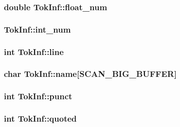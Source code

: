 \subsubsection[{\texorpdfstring{float\+\_\+num}{float_num}}]{\setlength{\rightskip}{0pt plus 5cm}double Tok\+Inf\+::float\+\_\+num}\hypertarget{structTokInf_afddf6ad76bb496c8ddd35a5b773f4360}{}\label{structTokInf_afddf6ad76bb496c8ddd35a5b773f4360}
\subsubsection[{\texorpdfstring{int\+\_\+num}{int_num}}]{ Tok\+Inf\+::int\+\_\+num}\hypertarget{structTokInf_a9f5266be5fc6a8e446ed3e660032d0ad}{}\label{structTokInf_a9f5266be5fc6a8e446ed3e660032d0ad}
\subsubsection[{\texorpdfstring{line}{line}}]{\setlength{\rightskip}{0pt plus 5cm}int Tok\+Inf\+::line}\hypertarget{structTokInf_a141b87290988df7a09d0f84593cd02c5}{}\label{structTokInf_a141b87290988df7a09d0f84593cd02c5}
\subsubsection[{\texorpdfstring{name}{name}}]{\setlength{\rightskip}{0pt plus 5cm}char Tok\+Inf\+::name\mbox{[}{\bf S\+C\+A\+N\+\_\+\+B\+I\+G\+\_\+\+B\+U\+F\+F\+ER}\mbox{]}}\hypertarget{structTokInf_aa56c61670fa2e571afc6647c76af2103}{}\label{structTokInf_aa56c61670fa2e571afc6647c76af2103}
\subsubsection[{\texorpdfstring{punct}{punct}}]{\setlength{\rightskip}{0pt plus 5cm}int Tok\+Inf\+::punct}\hypertarget{structTokInf_addc6977c79a52835a28c0347c453df5d}{}\label{structTokInf_addc6977c79a52835a28c0347c453df5d}
\subsubsection[{\texorpdfstring{quoted}{quoted}}]{\setlength{\rightskip}{0pt plus 5cm}int Tok\+Inf\+::quoted}\hypertarget{structTokInf_aedaf8feef7d9708e8a946df56d7cdb66}{}\label{structTokInf_aedaf8feef7d9708e8a946df56d7cdb66}
